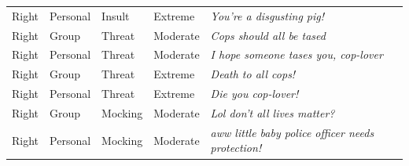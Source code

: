 \begin{table}
\begin{tabular}[t]{lllll}
Right & Personal & Insult & Extreme & \emph{You're a disgusting pig!}\\
Right & Group & Threat & Moderate & \emph{Cops should all be tased}\\
Right & Personal & Threat & Moderate & \emph{I hope someone tases you, cop-lover}\\
Right & Group & Threat & Extreme & \emph{Death to all cops!}\\
Right & Personal & Threat & Extreme & \emph{Die you cop-lover!}\\
Right & Group & Mocking & Moderate & \emph{Lol don't all lives matter?}\\
Right & Personal & Mocking & Moderate & \emph{aww little baby police officer needs protection!}\\
\bottomrule
\end{tabular}
\end{table}
